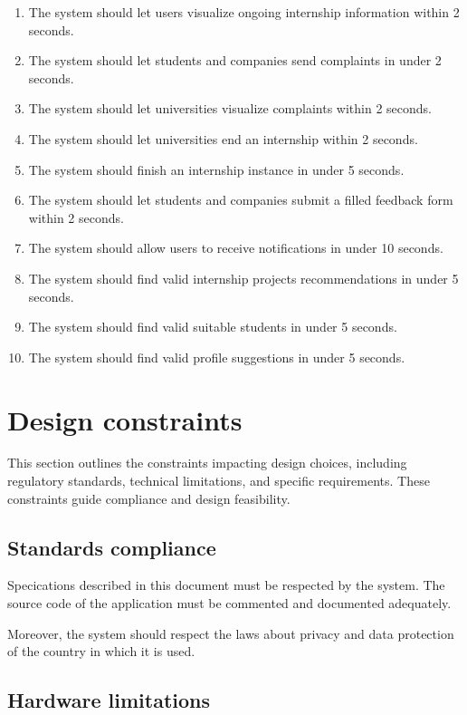\begin{enumerate}[label=\textbf{SR\arabic* -}]
    \item The system should let users visualize ongoing internship information within 2 seconds.
    \item The system should let students and companies send complaints in under 2 seconds.
    \item The system should let universities visualize complaints within 2 seconds.
    \item The system should let universities end an internship within 2 seconds.
    \item The system should finish an internship instance in under 5 seconds.
    \item The system should let students and companies submit a filled feedback form within 2 seconds.
    \item The system should allow users to receive notifications in under 10 seconds.
    \item The system should find valid internship projects recommendations in under 5 seconds.
    \item The system should find valid suitable students in under 5 seconds.
    \item The system should find valid profile suggestions in under 5 seconds.
\end{enumerate}

\section{Design constraints}

This section outlines the constraints impacting design choices, including regulatory standards, technical limitations, and specific requirements.
These constraints guide compliance and design feasibility.

\subsection{Standards compliance}

Specications described in this document must be respected by the system.
The source code of the application must be commented and documented adequately.

Moreover, the system should respect the laws about privacy and data protection of the country in which it is used.

\subsection{Hardware limitations}

